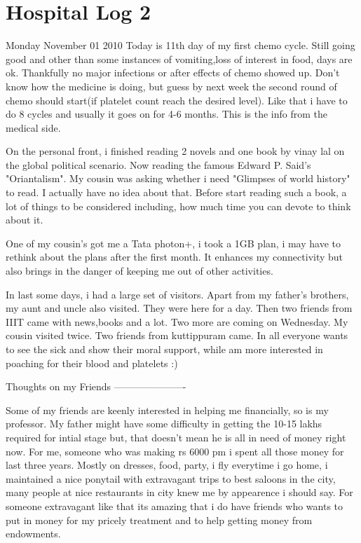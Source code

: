 \section*{Hospital Log 2}
\vskip 2pt

Monday November 01 2010 
Today is 11th day of my first chemo cycle. Still going good and other than some instances of vomiting,loss of interest in food, days are ok. Thankfully no major infections or after effects of chemo showed up. Don't know how the medicine is doing, but guess by next week the second round of chemo should start(if platelet count reach the desired level). Like that i have to do 8 cycles and usually it goes on for 4-6 months. This is the info from the medical side.

On the personal front, i finished reading 2 novels and one book by vinay lal on the global political scenario. Now reading the famous Edward P. Said's "Oriantalism". My cousin was asking whether i need "Glimpses of world history" to read. I actually have no idea about that. Before start reading such a book, a lot of things to be considered including, how much time you can devote to think about it. 

One of my cousin's got me a Tata photon+, i took a 1GB plan, i may have to rethink about the plans after the first month. It enhances my connectivity but also brings in the danger of keeping me out of other activities.

In last some days, i had a large set of visitors. Apart from my father's brothers, my aunt and uncle also visited. They were here for a day. Then two friends from IIIT came with news,books and a lot. Two more are coming on Wednesday. My cousin visited twice. Two friends from kuttippuram came. In all everyone wants to see the sick and show their moral support, while am more interested in poaching for their blood and platelets :) 

Thoughts on my Friends
----------------------

Some of my friends are keenly interested in helping me financially, so is my professor. My father might have some difficulty in getting the 10-15 lakhs required for intial stage but, that doesn't mean he is all in need of money right now. For me, someone who was making rs 6000 pm i spent all those money for last three years. Mostly on dresses, food, party, i fly everytime i go home, i maintained a nice ponytail with extravagant trips to best saloons in the city, many people at nice restaurants in city knew me by appearence i should say. For someone extravagant like that its amazing that i do have friends who wants to put in money for my pricely treatment and to help getting money from endowments. 

